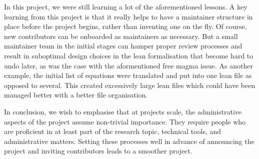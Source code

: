 In this project, we were still learning a lot of the aforementioned lessons. A key learning from this project is that it really helps to have a maintainer structure in place before the project begins, rather than inventing one on the fly. Of course, new contributors can be onboarded as maintainers as necessary. But a small maintainer team in the initial stages can hamper proper review processes and result in suboptimal design choices in the lean formalisation that become hard to undo later, as was the case with the aformentioned free magma issue. As another example, the initial list of equations were translated and put into one lean file as opposed to several. This created excessively large lean files which could have been managed better with a better file organisation.

In conclusion, we wish to emphasise that at projects scale, the administrative aspects of the project assume non-trivial importance. They require people who are proficient in at least part of the research topic, technical tools, and administrative matters. Setting these processes well in advance of announcing the project and inviting contributors leads to a smoother project.

